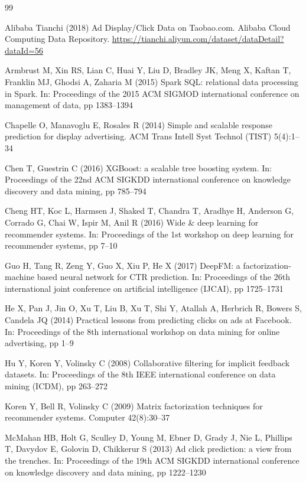 \documentclass[10pt,a4paper,twoside]{article}
\begin{document}
\begin{thebibliography}{99}

Alibaba Tianchi (2018) Ad Display/Click Data on Taobao.com. Alibaba Cloud Computing Data Repository. \url{https://tianchi.aliyun.com/dataset/dataDetail?dataId=56}

Armbrust M, Xin RS, Lian C, Huai Y, Liu D, Bradley JK, Meng X, Kaftan T, Franklin MJ, Ghodsi A, Zaharia M (2015) Spark SQL: relational data processing in Spark. In: Proceedings of the 2015 ACM SIGMOD international conference on management of data, pp 1383--1394

Chapelle O, Manavoglu E, Rosales R (2014) Simple and scalable response prediction for display advertising. ACM Trans Intell Syst Technol (TIST) 5(4):1--34

Chen T, Guestrin C (2016) XGBoost: a scalable tree boosting system. In: Proceedings of the 22nd ACM SIGKDD international conference on knowledge discovery and data mining, pp 785--794

Cheng HT, Koc L, Harmsen J, Shaked T, Chandra T, Aradhye H, Anderson G, Corrado G, Chai W, Ispir M, Anil R (2016) Wide \& deep learning for recommender systems. In: Proceedings of the 1st workshop on deep learning for recommender systems, pp 7--10

Guo H, Tang R, Zeng Y, Guo X, Xiu P, He X (2017) DeepFM: a factorization-machine based neural network for CTR prediction. In: Proceedings of the 26th international joint conference on artificial intelligence (IJCAI), pp 1725--1731

He X, Pan J, Jin O, Xu T, Liu B, Xu T, Shi Y, Atallah A, Herbrich R, Bowers S, Candela JQ (2014) Practical lessons from predicting clicks on ads at Facebook. In: Proceedings of the 8th international workshop on data mining for online advertising, pp 1--9

Hu Y, Koren Y, Volinsky C (2008) Collaborative filtering for implicit feedback datasets. In: Proceedings of the 8th IEEE international conference on data mining (ICDM), pp 263--272

Koren Y, Bell R, Volinsky C (2009) Matrix factorization techniques for recommender systems. Computer 42(8):30--37

McMahan HB, Holt G, Sculley D, Young M, Ebner D, Grady J, Nie L, Phillips T, Davydov E, Golovin D, Chikkerur S (2013) Ad click prediction: a view from the trenches. In: Proceedings of the 19th ACM SIGKDD international conference on knowledge discovery and data mining, pp 1222--1230


\end{thebibliography}
\end{document}

